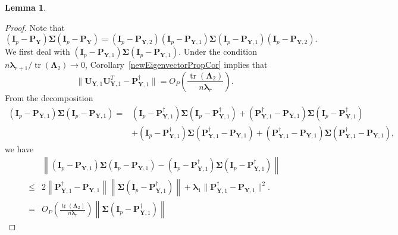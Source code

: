 \documentclass[12pt]{article} %
\DeclareMathOperator{\mytr}{tr}
\newcommand{\bP}{\mathbf{P}}
\newcommand{\bY}{\mathbf{Y}}
\newcommand{\bI}{\mathbf{I}}
\newcommand{\bU}{\mathbf{U}}
\newcommand{\bfsym}[1]{\ensuremath{\boldsymbol{#1}}}
\def\blambda {\bfsym {\lambda}}
\def\bLambda {\bfsym {\Lambda}}
\def\bSigma {\bfsym {\Sigma}}
\newtheorem{lemma}{Lemma}
\theoremstyle{definition}
\begin{document}
\begin{appendices}
\begin{lemma}
\end{lemma}
\begin{proof}
    Note that
    \begin{equation}\label{cho111}
         (\bI_p-\bP_{\bY})\bSigma (\bI_p-\bP_{\bY})
         =
         (\bI_p-\bP_{\bY,2})
         (\bI_p-\bP_{\bY,1})
         \bSigma 
         (\bI_p-\bP_{\bY,1})
         (\bI_p-\bP_{\bY,2}).
    \end{equation}
We first deal with
    $
         (\bI_p-\bP_{\bY,1})
         \bSigma 
         (\bI_p-\bP_{\bY,1})
         $.
Under the condition $n\blambda_{r+1}/\mytr(\bLambda_2)\to 0$, Corollary~\ref{newEigenvectorPropCor} implies that
\begin{equation*}\label{rain1}
        \|\bU_{\bY,1}\bU_{\bY,1}^T - 
\bP^\dagger_{\bY,1}
        \|
    =O_P\left(\frac{\mytr(\bLambda_2)}{n\blambda_r}\right).
\end{equation*}
    From the decomposition
         \begin{equation*}
         \begin{split}
         (\bI_p-\bP_{\bY,1})
         \bSigma 
         (\bI_p-\bP_{\bY,1})
         =&
         (\bI_p-\bP_{\bY,1}^{\dagger})
         \bSigma 
         (\bI_p-\bP_{\bY,1}^{\dagger})
         +
         (\bP_{\bY,1}^{\dagger}-\bP_{\bY,1})
         \bSigma 
         (\bI_p-\bP_{\bY,1}^{\dagger})
         \\
         &+
         (\bI_p-\bP_{\bY,1}^{\dagger})
         \bSigma 
         (\bP_{\bY,1}^{\dagger}-\bP_{\bY,1})
         +
         (\bP_{\bY,1}^{\dagger}-\bP_{\bY,1})
         \bSigma 
         (\bP_{\bY,1}^{\dagger}-\bP_{\bY,1}),
         \end{split}
         \end{equation*}
we have
         \begin{equation*}
         \begin{split}
         &\left\|
         (\bI_p-\bP_{\bY,1})
         \bSigma 
         (\bI_p-\bP_{\bY,1})
         -
         (\bI_p-\bP_{\bY,1}^{\dagger})
         \bSigma 
         (\bI_p-\bP_{\bY,1}^{\dagger})
         \right\|
         \\
         \leq&
         2
         \left\|\bP_{\bY,1}^{\dagger}-\bP_{\bY,1}\right\|
         \left\|\bSigma 
         (\bI_p-\bP_{\bY,1}^{\dagger})\right\|
         +
         \blambda_1\|\bP_{\bY,1}^{\dagger}-\bP_{\bY,1}\|^2.
         \\
         = &
         O_P\left(\frac{\mytr(\bLambda_2)}{n\blambda_r}\right)
         \left\|\bSigma 
         (\bI_p-\bP_{\bY,1}^{\dagger})\right\|

\end{split}
\end{equation*}
\end{proof}
\end{appendices}
\end{document}

